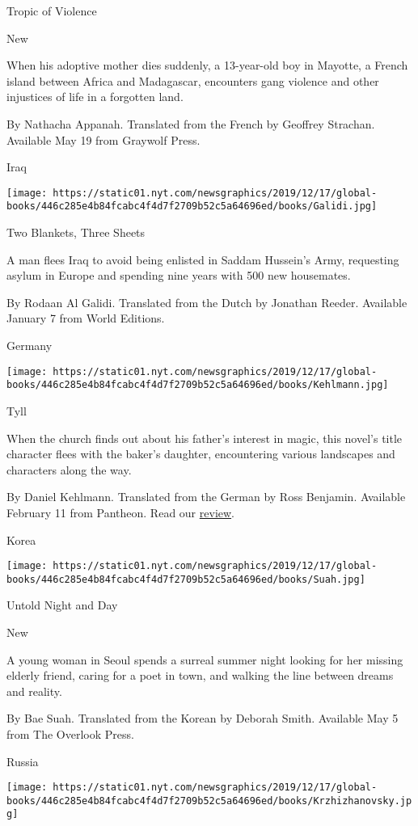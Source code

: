 Tropic of Violence

New

When his adoptive mother dies suddenly, a 13-year-old boy in Mayotte, a
French island between Africa and Madagascar, encounters gang violence
and other injustices of life in a forgotten land.

 By Nathacha Appanah. Translated from the French by Geoffrey Strachan.
Available May 19 from Graywolf Press.

Iraq

\texttt{[image: https://static01.nyt.com/newsgraphics/2019/12/17/global-books/446c285e4b84fcabc4f4d7f2709b52c5a64696ed/books/Galidi.jpg]}

Two Blankets, Three Sheets

A man flees Iraq to avoid being enlisted in Saddam Hussein's Army,
requesting asylum in Europe and spending nine years with 500 new
housemates.

 By Rodaan Al Galidi. Translated from the Dutch by Jonathan Reeder.
Available January 7 from World Editions.

Germany

\texttt{[image: https://static01.nyt.com/newsgraphics/2019/12/17/global-books/446c285e4b84fcabc4f4d7f2709b52c5a64696ed/books/Kehlmann.jpg]}

Tyll

When the church finds out about his father's interest in magic, this
novel's title character flees with the baker's daughter, encountering
various landscapes and characters along the way.

 By Daniel Kehlmann. Translated from the German by Ross Benjamin.
Available February 11 from Pantheon. Read our
\href{https://www.nytimes.com/2020/02/11/books/review/tyll-daniel-kehlmann.html}{review}.

Korea

\texttt{[image: https://static01.nyt.com/newsgraphics/2019/12/17/global-books/446c285e4b84fcabc4f4d7f2709b52c5a64696ed/books/Suah.jpg]}

Untold Night and Day

New

A young woman in Seoul spends a surreal summer night looking for her
missing elderly friend, caring for a poet in town, and walking the line
between dreams and reality.

 By Bae Suah. Translated from the Korean by Deborah Smith. Available May
5 from The Overlook Press.

Russia

\texttt{[image: https://static01.nyt.com/newsgraphics/2019/12/17/global-books/446c285e4b84fcabc4f4d7f2709b52c5a64696ed/books/Krzhizhanovsky.jpg]}

